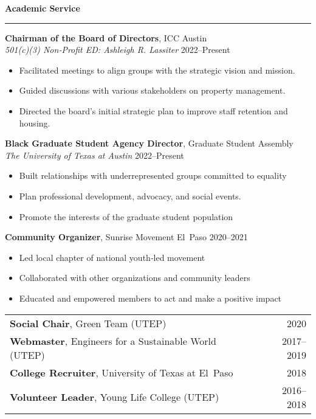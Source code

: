 \documentclass[11pt]{article}
\newcommand{\sectionheading}[1]{%
  \vspace{1.6ex}%
  {\large\bfseries #1}\par\vspace{0.4ex}
  \hrule height 0.5pt\vspace{0.8ex}%
}
\begin{document}
\sectionheading{Academic Service}

\textbf{Chairman of the Board of Directors}, ICC Austin\\
\textit{501(c)(3) Non‐Profit \quad ED: Ashleigh R. Lassiter} \hfill 2022--Present
\begin{itemize}
  \item Facilitated meetings to align groups with the strategic vision and mission.
  \item Guided discussions with various stakeholders on property management.
  \item Directed the board’s initial strategic plan to improve staff retention and housing.
\end{itemize}

\textbf{Black Graduate Student Agency Director}, Graduate Student Assembly\\
\textit{The University of Texas at Austin} \hfill 2022--Present
\begin{itemize}
  \item Built relationships with underrepresented groups committed to equality
  \item Plan professional development, advocacy, and social events.
  \item Promote the interests of the graduate student population
\end{itemize}

\textbf{Community Organizer}, Sunrise Movement El Paso \hfill 2020--2021
\begin{itemize}
  \item Led local chapter of national youth‐led movement
  \item Collaborated with other organizations and community leaders
  \item Educated and empowered members to act and make a positive impact
\end{itemize}

\begin{tabular*}{\textwidth}{@{\extracolsep{\fill}}p{}r}
  \textbf{Social Chair}, Green Team (UTEP) & 2020\\[0.4ex]
  \textbf{Webmaster}, Engineers for a Sustainable World (UTEP) & 2017--2019\\[0.4ex]
  \textbf{College Recruiter}, University of Texas at El Paso & 2018\\[0.4ex]
  \textbf{Volunteer Leader}, Young Life College (UTEP) & 2016--2018\\
\end{tabular*}
\end{document}
